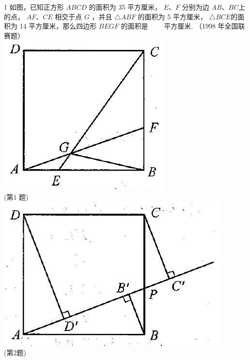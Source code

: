 \documentclass[10pt]{article}
\begin{document}
1 如图，已知正方形 $A B C D$ 的面积为 35 平方厘米， $E 、 F$ 分别为边 $A B 、 B C$上的点， $A F 、 C E$ 相交于点 $G$ ，并且 $\triangle A B F$ 的面积为 5 平方厘米， $\triangle B C E$的面积为 14 平方厘米，那么四边形 $B E G F$ 的面积是 $\qquad$平方厘米. （1998 年全国联赛题）\\
\includegraphics[max width=\textwidth, center]{2024_10_30_2c8f45efd4a519b08e1ag-134(4)}\\
(第1 题)\\
\includegraphics[max width=\textwidth, center]{2024_10_30_2c8f45efd4a519b08e1ag-134(3)}\\
(第2题)
\end{document}
